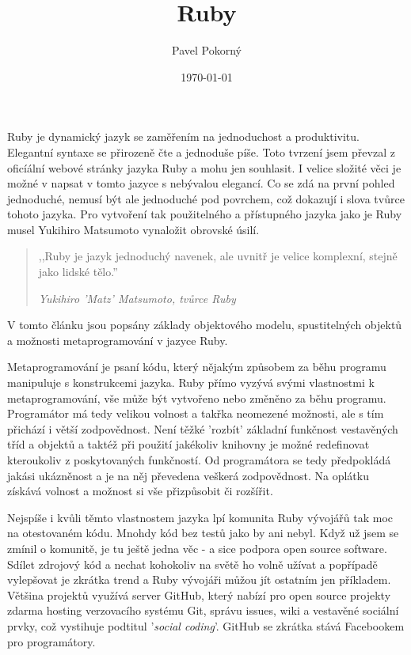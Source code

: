 \documentclass[12pt,a4paper,oneside]{article}
\begin{document}
\def\refname{Literatura}
\lstset{language=Ruby}

\title{Ruby}
\author{Pavel Pokorný}
\date{\today}
\maketitle


Ruby je dynamický jazyk se zaměřením na jednoduchost a produktivitu. Elegantní syntaxe se přirozeně čte a jednoduše píše. Toto tvrzení jsem převzal z oficíální webové stránky jazyka Ruby a mohu jen souhlasit. I velice složité věci je možné v napsat v tomto jazyce s nebývalou elegancí. Co se zdá na první pohled jednoduché, nemusí být ale jednoduché pod povrchem, což dokazují i slova tvůrce tohoto jazyka. Pro vytvoření tak použitelného a přístupného jazyka jako je Ruby musel Yukihiro Matsumoto vynaložit obrovské úsilí.

\begin{quotation}
,,Ruby je jazyk jednoduchý navenek, ale uvnitř je velice komplexní, stejně jako lidské tělo.'' 

\em{Yukihiro 'Matz' Matsumoto, tvůrce Ruby}
\end{quotation}

V tomto článku jsou popsány základy objektového modelu, spustitelných objektů a možnosti metaprogramování v jazyce Ruby.

Metaprogramování je psaní kódu, který nějakým způsobem za běhu programu manipuluje s konstrukcemi jazyka. Ruby přímo vyzývá svými vlastnostmi k metaprogramování, vše může být vytvořeno nebo změněno za běhu programu. Programátor má tedy velikou volnost a takřka neomezené možnosti, ale s tím přichází i větší zodpovědnost. Není těžké 'rozbít' základní funkčnost vestavěných tříd a objektů a taktéž při použití jakékoliv knihovny je možné redefinovat kteroukoliv z poskytovaných funkčností. Od programátora se tedy předpokládá jakási ukázněnost a je na něj převedena veškerá zodpovědnost. Na oplátku získává volnost a možnost si vše přizpůsobit či rozšířit.

Nejspíše i kvůli těmto vlastnostem jazyka lpí komunita Ruby vývojářů tak moc na otestovaném kódu. Mnohdy kód bez testů jako by ani nebyl. Když už jsem se zmínil o komunitě, je tu ještě jedna věc - a sice podpora open source software. Sdílet zdrojový kód a nechat kohokoliv na světě ho volně užívat a popřípadě vylepšovat je zkrátka trend a Ruby vývojáři můžou jít ostatním jen příkladem. Většina projektů využívá server GitHub, který nabízí pro open source projekty zdarma hosting verzovacího systému Git, správu issues, wiki a vestavěné sociální prvky, což vystihuje podtitul '\emph{social coding}'. GitHub se zkrátka stává Facebookem pro programátory.
\end{document}
